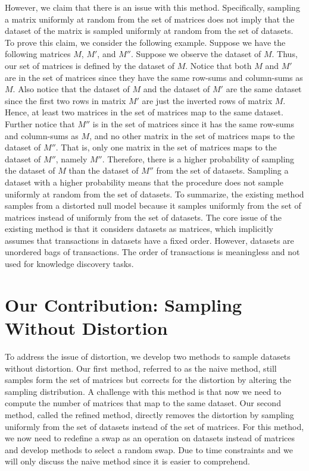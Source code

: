 \documentclass{article}
\begin{document}
However, we claim that there is an issue with this method. Specifically,
sampling a matrix uniformly at random from the set of matrices does not imply
that the dataset of the matrix is sampled uniformly at random from the set of
datasets. To prove this claim, we consider the following example. Suppose we
have the following matrices $M$, $M'$, and $M''$. Suppose we observe the dataset
of $M$. Thus, our set of matrices is defined by the dataset of $M$. Notice that
both $M$ and $M'$ are in the set of matrices since they have the same row-sums
and column-sums as $M$. Also notice that the dataset of $M$ and the dataset of
$M'$ are the same dataset since the first two rows in matrix $M'$ are just
the inverted rows of matrix $M$. Hence, at least two matrices in the set of
matrices map to the same dataset. Further notice that $M''$ is in the set of
matrices since it has the same row-sums and column-sums as $M$, and no other
matrix in the set of matrices maps to the dataset of $M''$. That is, only one
matrix in the set of matrices maps to the dataset of $M''$, namely $M''$.
Therefore, there is a higher probability of sampling the dataset of $M$ than the
dataset of $M''$ from the set of datasets. Sampling a dataset with a higher
probability means that the procedure does not sample uniformly at random from
the set of datasets. To summarize, the existing method samples from a distorted
null model because it samples uniformly from the set of matrices instead of
uniformly from the set of datasets. The core issue of the existing method is
that it considers datasets as matrices, which implicitly assumes that
transactions in datasets have a fixed order. However, datasets are unordered
bags of transactions. The order of transactions is meaningless and not used for
knowledge discovery tasks.

\section*{Our Contribution: Sampling Without Distortion}

To address the issue of distortion, we develop two methods to sample datasets
without distortion. Our first method, referred to as the naive method, still
samples form the set of matrices but corrects for the distortion by altering the
sampling distribution. A challenge with this method is that now we need to
compute the number of matrices that map to the same dataset. Our second method,
called the refined method, directly removes the distortion by sampling uniformly
from the set of datasets instead of the set of matrices. For this method, we now
need to redefine a swap as an operation on datasets instead of matrices and
develop methods to select a random swap. Due to time constraints and we will
only discuss the naive method since it is easier to comprehend.
\end{document}
